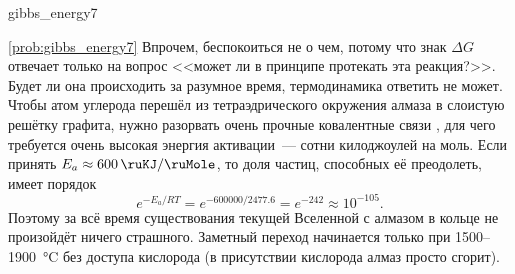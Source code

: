 \begin{problem}{}{gibbs_energy7}
\begin{sol}{\ref{prob:gibbs_energy7}}
        Впрочем, беспокоиться не о чем, потому что знак $\Delta G$ отвечает только на вопрос <<может ли в принципе протекать эта реакция?>>. Будет ли она происходить за разумное время, термодинамика ответить не может. Чтобы атом углерода перешёл из тетраэдрического окружения алмаза в слоистую решётку графита, нужно разорвать очень прочные ковалентные связи , для чего требуется очень высокая энергия активации~--- сотни килоджоулей на моль. Если принять $E_a \approx \qty{600}{\ruKJ\per\ruMole}$, то доля частиц, способных её преодолеть, имеет порядок
        \begin{equation*}
            e^{-E_a/RT} = e^{-\num{600000}/\num{2477,6}} = e^{-\num{242}} \approx 10^{-105}.
        \end{equation*}
        Поэтому за всё время существования текущей Вселенной с алмазом в кольце не произойдёт ничего страшного. Заметный переход начинается только при \num{1500}--\qty{1900}{\degreeCelsius} без доступа кислорода (в присутствии кислорода алмаз просто сгорит).
    \end{sol}
\end{problem}

